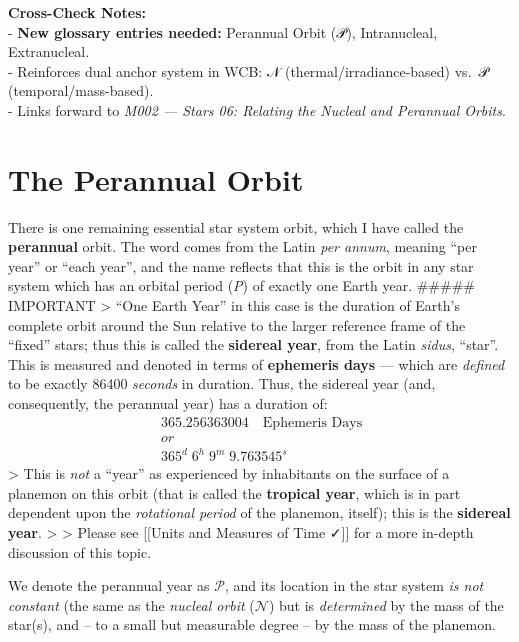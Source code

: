 \documentclass[
  letterpaper,
]{book}
\begin{document}
\textbf{Cross-Check Notes:}\\
- \textbf{New glossary entries needed:} Perannual Orbit (𝒫),
Intranucleal, Extranucleal.\\
- Reinforces dual anchor system in WCB: 𝒩 (thermal/irradiance-based)
vs.~𝒫 (temporal/mass-based).\\
- Links forward to \emph{M002 --- Stars 06: Relating the Nucleal and
Perannual Orbits}.

\section{The Perannual Orbit}\label{the-perannual-orbit}

There is one remaining essential star system orbit, which I have called
the \textbf{perannual} orbit. The word comes from the Latin \emph{per
annum}, meaning ``per year'' or ``each year'', and the name reflects
that this is the orbit in any star system which has an orbital period
(\emph{P}) of exactly one Earth year. \#\#\#\#\# IMPORTANT
\textgreater{} ``One Earth Year'' in this case is the duration of
Earth's complete orbit around the Sun relative to the larger reference
frame of the ``fixed'' stars; thus this is called the \textbf{sidereal
year}, from the Latin \emph{sidus}, ``star''. This is measured and
denoted in terms of \textbf{ephemeris days} --- which are \emph{defined}
to be exactly 86400 \emph{seconds} in duration. Thus, the sidereal year
(and, consequently, the perannual year) has a duration of: \[\
\begin{gather}
365.256363004 \quad \text{Ephemeris Days} \\
or \\
365^d\;6^h\;9^m\; 9.763545^s
\end{gather}
\] \textgreater{} This is \emph{not} a ``year'' as experienced by
inhabitants on the surface of a planemon on this orbit (that is called
the \textbf{tropical year}, which is in part dependent upon the
\emph{rotational period} of the planemon, itself); this is the
\textbf{sidereal year}. \textgreater{} \textgreater{} Please see
{[}{[}Units and Measures of Time ✓{]}{]} for a more in-depth discussion
of this topic.

We denote the perannual year as \(\mathcal{P}\), and its location in the
star system \emph{is not constant} (the same as the \emph{nucleal orbit}
(\(\mathcal{N}\)) but is \emph{determined} by the mass of the star(s),
and -- to a small but measurable degree -- by the mass of the planemon.
\end{document}
